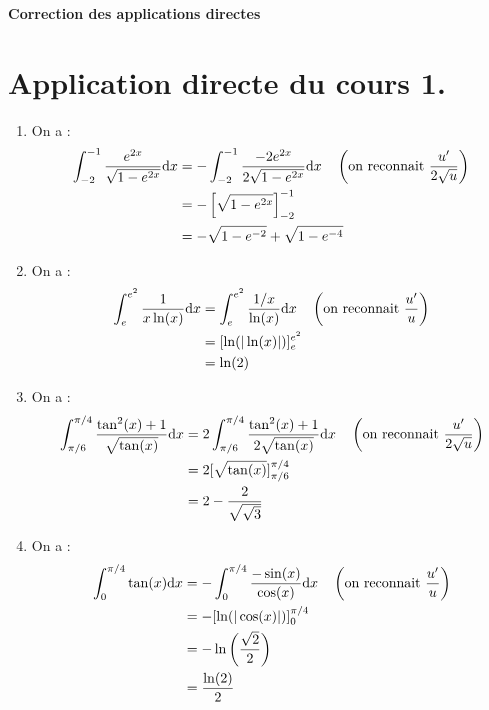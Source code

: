 \documentclass[french,11pt,twoside]{VcCours}
\newcommand{\dx}{\text{d}x}
\begin{document}
\begin{center}
    \large\bf 
    Correction des applications directes
\end{center}
\separationTitre


\section*{Application directe du cours 1.}

\begin{enumerate}
\item On a : 
\begin{align*}
\int_{-2}^{-1} \dfrac{e^{2x}}{\sqrt{1-e^{2x}}} \dx & = -\int_{-2}^{-1} \dfrac{-2e^{2x}}{2 \sqrt{1-e^{2x}}} \dx \quad \left(\hbox{on reconnait } \frac{u'}{2\sqrt{u}} \right) \\
& = - \left[\sqrt{1-e^{2x}}\right]_{-2}^{-1}  \\
& = - \sqrt{1-e^{-2}}+ \sqrt{1-e^{-4}} 
\end{align*}
\item On a :
\begin{align*}
 \int_{e}^{e^2} \dfrac{1}{x\ln(x)} \dx & = \int_{e}^{e^2} \dfrac{1/x}{\ln(x)} \dx \quad \left(\hbox{on reconnait } \frac{u'}{u} \right) \\
 & = [\ln(\vert \ln(x) \vert)]_{e}^{e^2} \\
 & = \ln(2) 
 \end{align*}
\item On a :
\begin{align*}
 \int_{\pi/6}^{\pi/4} \dfrac{\tan^2(x)+1}{\sqrt{\tan(x)}} \dx & =  2\int_{\pi/6}^{\pi/4} \dfrac{\tan^2(x)+1}{2\sqrt{\tan(x)}} \dx \quad \left(\hbox{on reconnait } \frac{u'}{2 \sqrt{u}} \right) \\
 & = 2 [\sqrt{\tan(x)} ]_{\pi/6}^{\pi/4} \\
 & = 2- \dfrac{2}{\sqrt{\sqrt{3}}} 
 \end{align*}
\item On a :
\begin{align*}
 \int_{0}^{\pi/4} \tan(x) \dx & =  - \int_{0}^{\pi/4} \frac{-\sin(x)}{\cos(x)} \dx  \quad \left(\hbox{on reconnait } \frac{u'}{u} \right) \\
 & = - [\ln(\vert \cos(x) \vert)]_{0}^{\pi/4} \\
 & = - \ln \left( \dfrac{\sqrt{2}}{2} \right)  \\
 & = \dfrac{\ln(2)}{2} 
 \end{align*}

\end{enumerate}
\end{document}
